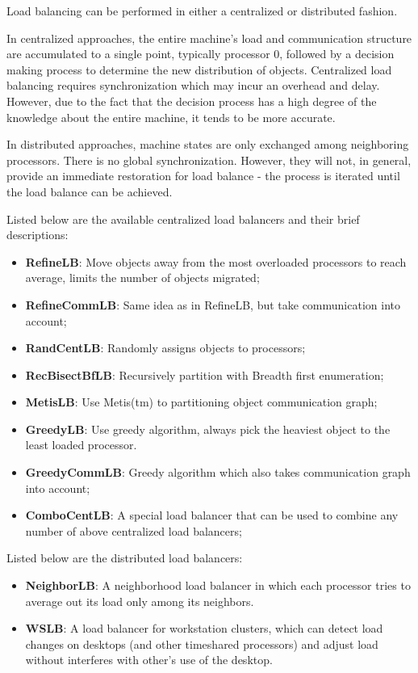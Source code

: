 Load balancing can be performed in either a centralized or distributed
fashion.

In centralized approaches, the entire machine's load and communication
structure are accumulated to a single point, typically processor 0, 
followed by a decision making process to determine the new distribution
of \charmpp objects. Centralized load balancing requires synchronization
which may incur an overhead and delay. However, due to the fact that
the decision process has a high degree of the knowledge about the entire
machine, it tends to be more accurate.

In distributed approaches, machine states are only exchanged among 
neighboring processors. There is no global synchronization. However,
they will not, in general, provide an immediate restoration for load balance -
the process is iterated until the load balance can be achieved.

Listed below are the available centralized load balancers and their brief 
descriptions:
\begin{itemize}
\item {\bf RefineLB}:     Move objects away from the most overloaded processors to reach average, limits the number of objects migrated;
\item {\bf RefineCommLB}:     Same idea as in RefineLB, but take communication into account;
\item {\bf RandCentLB}:   Randomly assigns objects to processors;
\item {\bf RecBisectBfLB}:        Recursively partition with Breadth first enumeration;
\item {\bf MetisLB}:      Use Metis(tm) to partitioning object communication graph;
\item {\bf GreedyLB}:   Use greedy algorithm, always pick the heaviest object to the least loaded processor.
\item {\bf GreedyCommLB}:       Greedy algorithm which also takes communication graph into account;
\item {\bf ComboCentLB}:  A special load balancer that can be used to combine any number of above centralized load balancers;
\end{itemize}

Listed below are the distributed load balancers:
\begin{itemize}
\item {\bf NeighborLB}:   A neighborhood load balancer in which each processor tries to average out its load only among its neighbors.
\item {\bf WSLB}:   A load balancer for workstation clusters, which can detect load changes on desktops (and other timeshared processors) and adjust load without interferes with other's use of the desktop.
\end{itemize}

